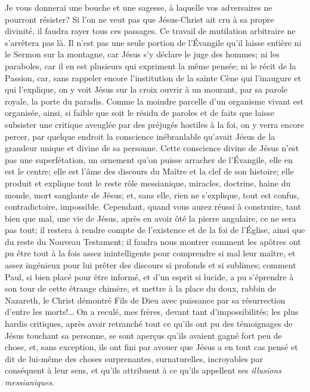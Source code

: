 \Og{} Je vous donnerai une bouche et une sagesse, à laquelle vos adversaires ne pourront résister\Fg{}?
Si l’on ne veut pas que Jésus-Christ ait cru à sa propre divinité, il faudra rayer tous ces passages.
Ce travail de mutilation arbitraire ne s’arrêtera pas là.
Il n’est pas une seule portion de l’Évangile qu’il laisse entière\frcolon{}
ni le Sermon sur la montagne, car Jésus s’y déclare le juge des hommes;
ni les paraboles, car il en est plusieurs qui expriment la même pensée;
ni le récit de la Passion, car, sans rappeler encore l’institution de la sainte Cène qui l’inaugure et qui l’explique,
on y voit Jésus sur la croix ouvrir à un mourant, par sa parole royale, la porte du paradis.
Comme la moindre parcelle d’un organisme vivant est organisée, ainsi, si faible que soit le résidu de paroles et de faits
que laisse subsister une critique aveuglée par des préjugés hostiles à la foi, on y verra encore percer,
par quelque endroit la conscience inébranlable qu’avait Jésus de la grandeur unique et divine de sa personne.
Cette conscience divine de Jésus n’est pas une superfétation, un ornement qu’on puisse arracher de l’Évangile,
elle en est le centre; elle est l’âme des discours du Maître et la clef de son histoire;
elle produit et explique tout le reste\frcolon{}
rôle messianique, miracles, doctrine, haine du monde, mort sanglante de Jésus;
et, sans elle, rien ne s’explique, tout est confus, contradictoire, impossible.
Cependant, quand vous aurez réussi à construire, tant bien que mal, une vie de Jésus,
après en avoir ôté la pierre angulaire, ce ne sera pas tout; il restera à rendre compte de l’existence et de la foi de l’Église,
ainsi que du reste du Nouveau Testament;
il faudra nous montrer comment les apôtres ont pu être tout à la fois assez inintelligents pour comprendre si mal leur maître,
et assez ingénieux pour lui prêter des discours si profonds et si sublimes;
comment Paul, si bien placé pour être informé, et d’un esprit si lucide,
a pu s’éprendre à son tour de cette étrange chimère, et mettre à la place du doux, rabbin de Nazareth,
le Christ démontré Fils de Dieu avec puissance par sa résurrection d’entre les morts!…
On a reculé, mes frères, devant tant d’impossibilités; les plus hardis critiques, après avoir retranché tout ce qu’ils ont pu
des témoignages de Jésus touchant sa personne, se sont aperçus qu’ils avaient gagné fort peu de chose,
et, sans exception, ils ont fini par avouer que Jésus a en tout cas pensé et dit de lui-même
des choses surprenantes, surnaturelles, incroyables par conséquent à leur sens,
et qu’ils attribuent à ce qu’ils appellent ses \emph{illusions messianiques}.

